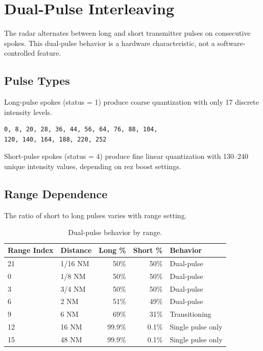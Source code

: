 \documentclass[11pt,letterpaper]{article}
\begin{document}
\section{Dual-Pulse Interleaving}
\label{sec:dualpulse}

The radar alternates between long and short transmitter pulses on consecutive spokes. This dual-pulse behavior is a hardware characteristic, not a software-controlled feature.

\subsection{Pulse Types}

Long-pulse spokes (status = 1) produce coarse quantization with only 17 discrete intensity levels.

\begin{lstlisting}
0, 8, 20, 28, 36, 44, 56, 64, 76, 88, 104,
120, 140, 164, 188, 220, 252
\end{lstlisting}

Short-pulse spokes (status = 4) produce fine linear quantization with 130--240 unique intensity values, depending on rez boost settings.

\subsection{Range Dependence}

The ratio of short to long pulses varies with range setting.

\begin{table}[h]
\centering
\caption{Dual-pulse behavior by range.}
\label{tab:dualpulse}
\begin{tabular}{@{}llrrl@{}}
\toprule
\textbf{Range Index} & \textbf{Distance} & \textbf{Long \%} & \textbf{Short \%} & \textbf{Behavior} \\
\midrule
21 & 1/16 NM & 50\% & 50\% & Dual-pulse \\
0 & 1/8 NM & 50\% & 50\% & Dual-pulse \\
3 & 3/4 NM & 50\% & 50\% & Dual-pulse \\
6 & 2 NM & 51\% & 49\% & Dual-pulse \\
9 & 6 NM & 69\% & 31\% & Transitioning \\
12 & 16 NM & 99.9\% & 0.1\% & Single pulse only \\
15 & 48 NM & 99.9\% & 0.1\% & Single pulse only \\
\bottomrule
\end{tabular}
\end{table}
\end{document}
